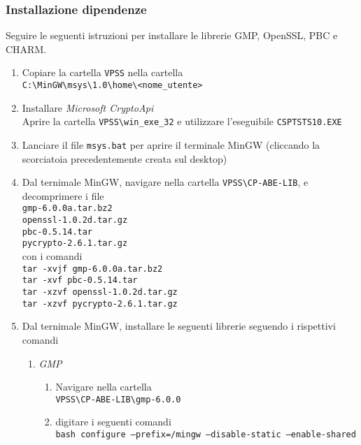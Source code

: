 \documentclass[a4paper,twoside,10pt,openany]{scrbook}
\begin{document}
\subsubsection{Installazione dipendenze}\label{sec:installazione_dep}
Seguire le seguenti istruzioni per installare le librerie GMP, OpenSSL, PBC e CHARM.
\begin{enumerate}
 \item Copiare la cartella \texttt{VPSS} nella cartella\\
       \texttt{C:\textbackslash MinGW\textbackslash msys\textbackslash 1.0\textbackslash home\textbackslash<nome\_utente>}
 \item Installare \emph{Microsoft CryptoApi}\\
       Aprire la cartella \texttt{VPSS\textbackslash win\_exe\_32} e utilizzare l'eseguibile \texttt{CSPTSTS10.EXE}
 \item Lanciare il file \texttt{msys.bat} per aprire il terminale MinGW (cliccando la scorciatoia precedentemente creata sul desktop)
 \item Dal ternimale MinGW, navigare nella cartella \texttt{VPSS\textbackslash CP-ABE-LIB}, 
       e decomprimere i file \\
	\texttt{gmp-6.0.0a.tar.bz2}\\
	\texttt{openssl-1.0.2d.tar.gz}\\
	\texttt{pbc-0.5.14.tar}\\
	\texttt{pycrypto-2.6.1.tar.gz}\\
	con i comandi\\
	\texttt{tar -xvjf gmp-6.0.0a.tar.bz2}\\
	\texttt{tar -xvf pbc-0.5.14.tar}\\
	\texttt{tar -xzvf openssl-1.0.2d.tar.gz}\\
	\texttt{tar -xzvf pycrypto-2.6.1.tar.gz}
 \item Dal ternimale MinGW, installare le seguenti librerie seguendo i rispettivi comandi
  \begin{enumerate}
    \item \emph{GMP}
    \begin{enumerate}
      \item Navigare nella cartella \\
	    \texttt{VPSS\textbackslash CP-ABE-LIB\textbackslash gmp-6.0.0}
      \item  digitare i seguenti comandi\\
	    \texttt{bash configure --prefix=/mingw --disable-static --enable-shared\\
}
\end{enumerate}
\end{enumerate}
\end{enumerate}
\end{document}
